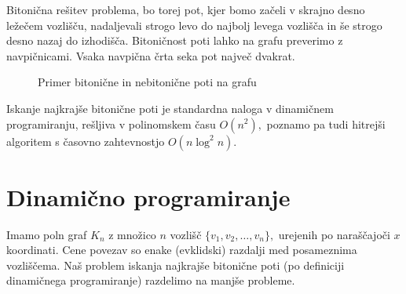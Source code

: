 \documentclass[12pt,a4paper]{amsart}
\theoremstyle{definition}
\theoremstyle{plain}
\begin{document}
\noindent
Bitonična rešitev problema, bo torej pot, kjer bomo začeli v skrajno desno ležečem vozlišču, nadaljevali strogo
levo do najbolj levega vozlišča in še strogo desno nazaj do izhodišča. Bitoničnost poti lahko na grafu 
preverimo z navpičnicami. Vsaka navpična črta seka pot največ dvakrat.


\begin{figure}[!htb]%
    \centering
    \qquad
    \caption{Primer bitonične in nebitonične poti na grafu}%
    \label{fig:example}%
\end{figure}


\noindent
Iskanje najkrajše bitonične poti je standardna naloga v dinamičnem programiranju, rešljiva v polinomskem
času $O(n^2),$ poznamo pa tudi hitrejši algoritem s časovno zahtevnostjo $O(n \log^2 n).$

\section{Dinamično programiranje}

\noindent
Imamo poln graf $K_n$ z množico $n$ vozlišč $\{v_1, v_2, \ldots, v_n\},$ urejenih po naraščajoči $x$ koordinati. 
Cene povezav so enake (evklidski) razdalji med posameznima vozliščema. Naš problem iskanja najkrajše 
bitonične poti (po definiciji dinamičnega programiranje) razdelimo na manjše probleme.
\newline
\end{document}
